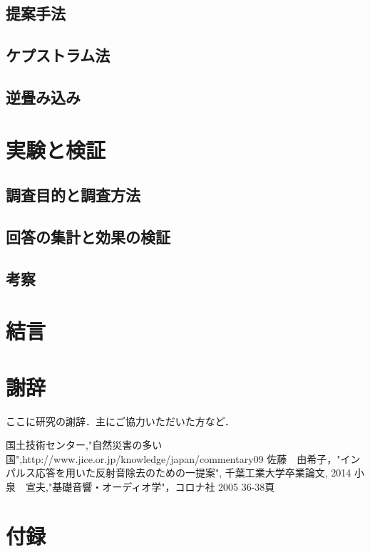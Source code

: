 \documentclass[a4j,11pt]{jsarticle}
\begin{document}
\begin{equation}
\end{equation}

\newpage

\subsection{提案手法}
\subsection{ケプストラム法}
\subsection{逆畳み込み}

\newpage

\section{実験と検証}
\subsection{調査目的と調査方法}
\subsection{回答の集計と効果の検証}
\subsection{考察}

\newpage
\section{結言}

\newpage
\section*{謝辞}
ここに研究の謝辞．主にご協力いただいた方など．

\newpage

\begin{thebibliography}{99}

国土技術センター,"自然災害の多い国",http://www.jice.or.jp/knowledge/japan/commentary09
佐藤　由希子，"インパルス応答を用いた反射音除去のための一提案", 千葉工業大学卒業論文, 2014
小泉　宣夫,"基礎音響・オーディオ学"，コロナ社 2005 36-38頁

\end{thebibliography}

\newpage
\section*{付録}
\end{document}
